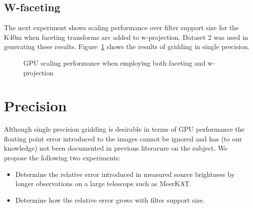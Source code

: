 \subsection{W-faceting}
The next experiment shows scaling performance over filter support size for the K40m 
when faceting transforms are added to w-projection. Dataset 2 was used in generating
these results. Figure~\ref{FIG_WFACETING} shows the results of gridding in
single precision.
\begin{figure}[ht!]
 \begin{mdframed}
 \centering
  \caption{GPU scaling performance when employing both faceting and w-projection}
  \label{FIG_WFACETING}
  \end{mdframed}
\end{figure}
\section{Precision}
\label{ch_sec_results}
Although single precision gridding is desirable in terms of GPU performance the floating point error introduced to the images cannot be ignored and has (to our knowledge) not been documented
in previous literarure on the subject. We propose the following two experiments:
\begin{itemize}
 \item Determine the relative error introduced in measured source brightness by longer observations on a large telescope such as MeerKAT.
 \item Determine how the relative error grows with filter support size.
\end{itemize}

